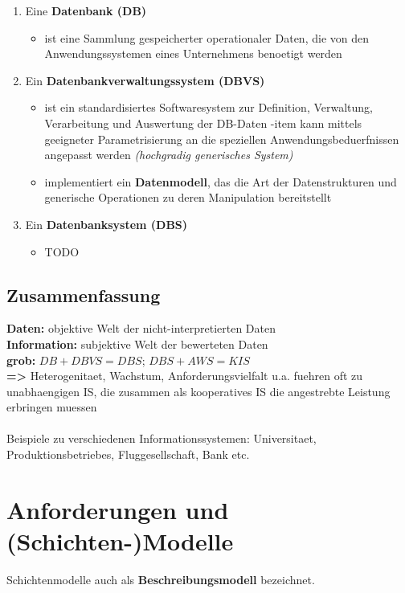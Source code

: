 \documentclass[a4paper,10pt]{article}
\begin{document}
\begin{enumerate}
\item Eine \textbf{Datenbank (DB)}
\begin{itemize}
\item ist eine Sammlung gespeicherter operationaler Daten, die von den Anwendungssystemen eines Unternehmens benoetigt werden
\end{itemize}
\item Ein \textbf{Datenbankverwaltungssystem (DBVS)}
\begin{itemize}
\item ist ein standardisiertes Softwaresystem zur Definition, Verwaltung, Verarbeitung und Auswertung der DB-Daten
-item kann mittels geeigneter Parametrisierung an die speziellen Anwendungsbeduerfnissen angepasst werden \emph{(hochgradig generisches System)}
\item implementiert ein \textbf{Datenmodell}, das die Art der Datenstrukturen und generische Operationen zu deren Manipulation bereitstellt
\end{itemize}
\item Ein \textbf{Datenbanksystem (DBS)}
\begin{itemize}
\item TODO
\end{itemize}
\end{enumerate}

\subsection{Zusammenfassung}
\textbf{Daten:} objektive Welt der nicht-interpretierten Daten\\
\textbf{Information:} subjektive Welt der bewerteten Daten\\
\textbf{grob:} $DB + DBVS = DBS$; $DBS + AWS = KIS$\\
\textbf{=\textgreater} Heterogenitaet, Wachstum, Anforderungsvielfalt u.a. fuehren oft zu unabhaengigen IS, die zusammen als kooperatives IS die angestrebte Leistung erbringen muessen
\\~\\
Beispiele zu verschiedenen Informationssystemen: Universitaet, Produktionsbetriebes, Fluggesellschaft, Bank etc.

\newpage
\section{Anforderungen und (Schichten-)Modelle}
Schichtenmodelle auch als \textbf{Beschreibungsmodell} bezeichnet.
\end{document}
